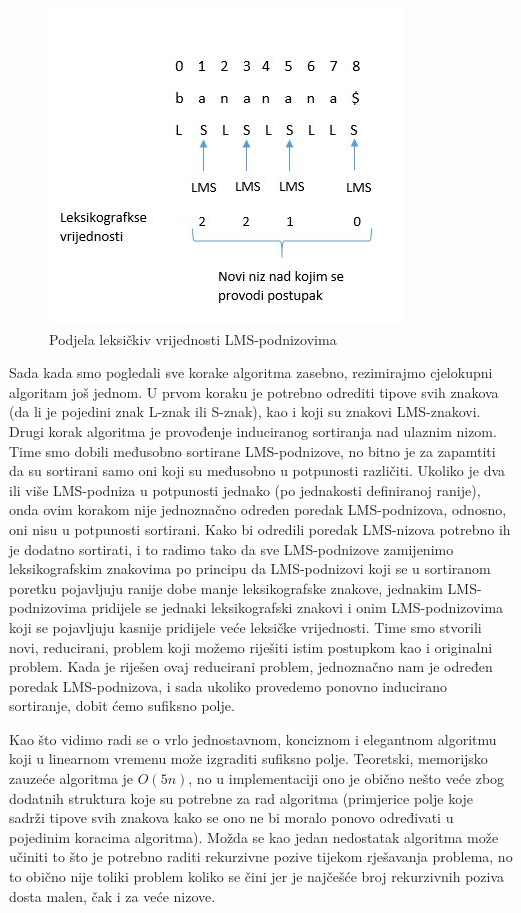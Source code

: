 \begin{figure}[H]
   \centering
       \includegraphics{./pictures/leksvrij.jpg}
 \caption{Podjela leksičkiv vrijednosti LMS-podnizovima}
 \label{fig:leks}
\end{figure}


Sada kada smo pogledali sve korake algoritma zasebno, rezimirajmo cjelokupni algoritam još jednom. U prvom koraku je potrebno odrediti tipove svih znakova (da li je pojedini znak L-znak ili S-znak), kao i koji su znakovi LMS-znakovi. Drugi korak algoritma je provođenje induciranog sortiranja nad ulaznim nizom. Time smo dobili međusobno sortirane LMS-podnizove, no bitno je za zapamtiti da su sortirani samo oni koji su međusobno u potpunosti različiti. Ukoliko je dva ili više LMS-podniza u potpunosti jednako (po jednakosti definiranoj ranije), onda ovim korakom nije jednoznačno određen poredak LMS-podnizova, odnosno, oni nisu u potpunosti sortirani. Kako bi odredili poredak LMS-nizova potrebno ih je dodatno sortirati, i to radimo tako da sve LMS-podnizove zamijenimo leksikografskim znakovima po principu da LMS-podnizovi koji se u sortiranom poretku pojavljuju ranije dobe manje leksikografske znakove, jednakim LMS-podnizovima pridijele se jednaki leksikografski znakovi i onim LMS-podnizovima koji se pojavljuju kasnije pridijele veće leksičke vrijednosti. Time smo stvorili novi, reducirani, problem koji možemo riješiti istim postupkom kao i originalni problem. Kada je riješen ovaj reducirani problem, jednoznačno nam je određen poredak LMS-podnizova, i sada ukoliko provedemo ponovno inducirano sortiranje, dobit ćemo sufiksno polje.


Kao što vidimo radi se o vrlo jednostavnom, konciznom i elegantnom algoritmu koji u linearnom vremenu može izgraditi sufiksno polje. Teoretski, memorijsko zauzeće algoritma je $O(5n)$, no u implementaciji ono je obično nešto veće zbog dodatnih struktura koje su potrebne za rad algoritma (primjerice polje koje sadrži tipove svih znakova kako se ono ne bi moralo ponovo određivati u pojedinim koracima algoritma). Možda se kao jedan nedostatak algoritma može učiniti to što je potrebno raditi rekurzivne pozive tijekom rješavanja problema, no to obično nije toliki problem koliko se čini jer je najčešće broj rekurzivnih poziva dosta malen, čak i za veće nizove.


